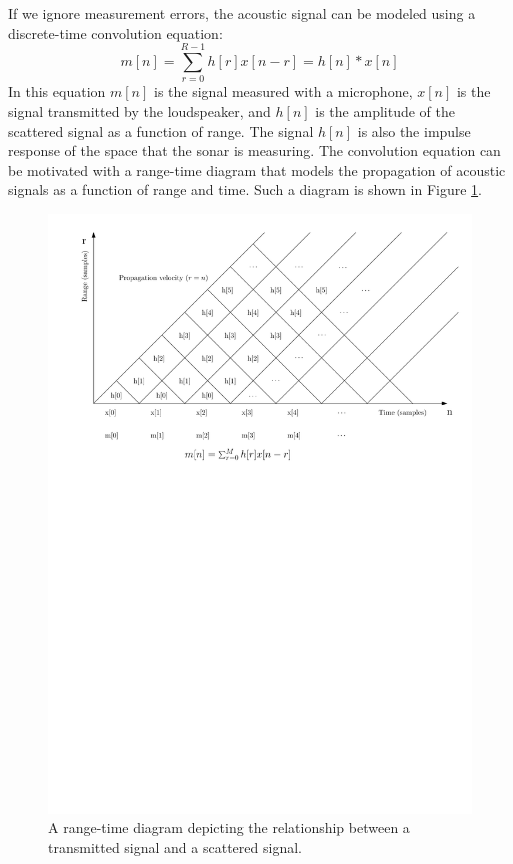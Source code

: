 If we ignore measurement errors, the acoustic signal can be modeled using
a discrete-time convolution equation:
\begin{equation}
  m[n] = \sum_{r=0}^{R-1} h[r]x[n-r] = h[n] * x[n]
\end{equation}
In this equation $m[n]$ is the signal measured with a microphone,
$x[n]$ is the signal transmitted by the loudspeaker, and $h[n]$ is
the amplitude of the scattered signal as a function of range. The
signal $h[n]$ is also the impulse response of the space that the sonar
is measuring. The convolution equation can be motivated with a
range-time diagram that models the propagation of acoustic signals as
a function of range and time. Such a diagram is shown in Figure
\ref{fig:range_time_diagram_ex}.

\begin{figure}
\begin{center}
\includegraphics[width=\textwidth]{Applications/figures/rd.pdf}
\end{center}
\caption{A range-time diagram depicting the relationship between a transmitted signal and a scattered signal.}
\label{fig:range_time_diagram_ex}
\end{figure}

